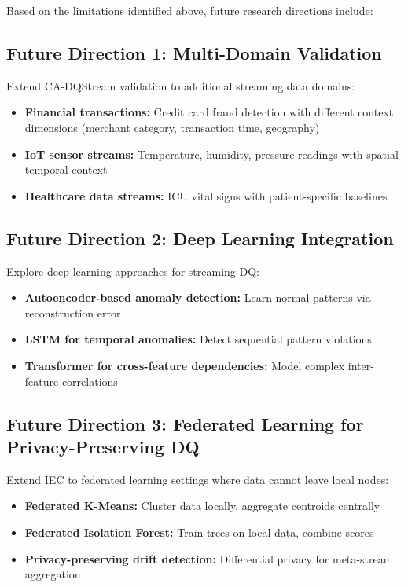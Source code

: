 Based on the limitations identified above, future research directions include:

\subsection{Future Direction 1: Multi-Domain Validation}
Extend CA-DQStream validation to additional streaming data domains:
\begin{itemize}
    \item \textbf{Financial transactions:} Credit card fraud detection with different context dimensions (merchant category, transaction time, geography)
    \item \textbf{IoT sensor streams:} Temperature, humidity, pressure readings with spatial-temporal context
    \item \textbf{Healthcare data streams:} ICU vital signs with patient-specific baselines
\end{itemize}

\subsection{Future Direction 2: Deep Learning Integration}
Explore deep learning approaches for streaming DQ:
\begin{itemize}
    \item \textbf{Autoencoder-based anomaly detection:} Learn normal patterns via reconstruction error
    \item \textbf{LSTM for temporal anomalies:} Detect sequential pattern violations
    \item \textbf{Transformer for cross-feature dependencies:} Model complex inter-feature correlations
\end{itemize}

\subsection{Future Direction 3: Federated Learning for Privacy-Preserving DQ}
Extend IEC to federated learning settings where data cannot leave local nodes:
\begin{itemize}
    \item \textbf{Federated K-Means:} Cluster data locally, aggregate centroids centrally
    \item \textbf{Federated Isolation Forest:} Train trees on local data, combine scores
    \item \textbf{Privacy-preserving drift detection:} Differential privacy for meta-stream aggregation
\end{itemize}

